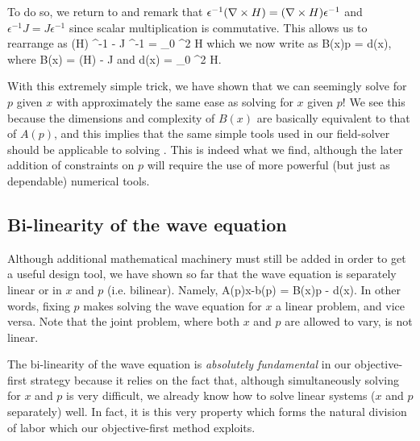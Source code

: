 To do so, we return to 
    and remark that 
    $\epsilon^{-1} (\nabla\times H) = (\nabla\times H) \epsilon^{-1}$ and
    $\epsilon^{-1} J = J \epsilon^{-1}$ 
    since scalar multiplication is commutative.
This allows us to rearrange  as
\BE \curl (\curl H) \epsilon^{-1} - \curl J \epsilon^{-1}  = \mu_0 \omega^2 H  \EE
which we now write as 
\BE B(x)p = d(x), \label{eq:Bd} \EE 
    where
\BE B(x) = \curl (\curl H) - \curl J\EE
    and 
\BE d(x)  = \mu_0 \omega^2 H.  \EE

With this extremely simple trick,
    we have shown that we can seemingly solve for $p$ given $x$
    with approximately the same ease as solving for $x$ given $p$!
We see this because the dimensions and complexity of $B(x)$ are basically
    equivalent to that of $A(p)$,
    and this implies that the same simple tools used in our field-solver
    should be applicable to solving .
This is indeed what we find, although the later addition of constraints on $p$
    will require the use of more powerful (but just as dependable) numerical tools.

\subsection{Bi-linearity of the wave equation}
Although additional mathematical machinery must still be added
    in order to get a useful design tool,
    we have shown so far that the wave equation is 
    separately linear or in $x$ and $p$ (i.e. bilinear).
Namely,
\BE A(p)x-b(p) = B(x)p - d(x). \label{eq:bilinear} \EE
In other words, fixing $p$ makes solving the wave equation for $x$
    a linear problem, and vice versa.
Note that the joint problem,
    where both $x$ and $p$ are allowed to vary,
    is not linear.

The bi-linearity of the wave equation
    is \emph{absolutely fundamental} in our objective-first strategy
    because it relies on the fact
    that, although simultaneously solving for $x$ and $p$ is very difficult,
    we already know how to solve linear systems ($x$ and $p$ separately) well.
In fact, it is this very property which forms the natural division of labor
    which our objective-first method exploits.

